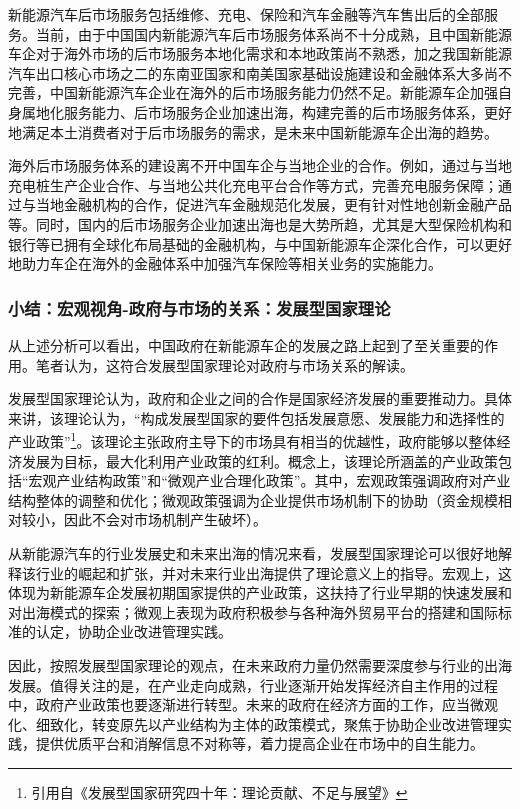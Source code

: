 \documentclass[a4paper, 10pt]{article}
\begin{document}
新能源汽车后市场服务包括维修、充电、保险和汽车金融等汽车售出后的全部服务。当前，由于中国国内新能源汽车后市场服务体系尚不十分成熟，且中国新能源车企对于海外市场的后市场服务本地化需求和本地政策尚不熟悉，加之我国新能源汽车出口核心市场之二的东南亚国家和南美国家基础设施建设和金融体系大多尚不完善，中国新能源汽车企业在海外的后市场服务能力仍然不足。新能源车企加强自身属地化服务能力、后市场服务企业加速出海，构建完善的后市场服务体系，更好地满足本土消费者对于后市场服务的需求，是未来中国新能源车企出海的趋势。

海外后市场服务体系的建设离不开中国车企与当地企业的合作。例如，通过与当地充电桩生产企业合作、与当地公共化充电平台合作等方式，完善充电服务保障；通过与当地金融机构的合作，促进汽车金融规范化发展，更有针对性地创新金融产品等。同时，国内的后市场服务企业加速出海也是大势所趋，尤其是大型保险机构和银行等已拥有全球化布局基础的金融机构，与中国新能源车企深化合作，可以更好地助力车企在海外的金融体系中加强汽车保险等相关业务的实施能力。

  \subsubsection{小结：宏观视角-政府与市场的关系：发展型国家理论}
  从上述分析可以看出，中国政府在新能源车企的发展之路上起到了至关重要的作用。笔者认为，这符合发展型国家理论对政府与市场关系的解读。

发展型国家理论认为，政府和企业之间的合作是国家经济发展的重要推动力。具体来讲，该理论认为，“构成发展型国家的要件包括发展意愿、发展能力和选择性的产业政策”\footnote{引用自《发展型国家研究四十年：理论贡献、不足与展望》}。该理论主张政府主导下的市场具有相当的优越性，政府能够以整体经济发展为目标，最大化利用产业政策的红利。概念上，该理论所涵盖的产业政策包括“宏观产业结构政策”和“微观产业合理化政策”。其中，宏观政策强调政府对产业结构整体的调整和优化；微观政策强调为企业提供市场机制下的协助（资金规模相对较小，因此不会对市场机制产生破坏）。

从新能源汽车的行业发展史和未来出海的情况来看，发展型国家理论可以很好地解释该行业的崛起和扩张，并对未来行业出海提供了理论意义上的指导。宏观上，这体现为新能源车企发展初期国家提供的产业政策，这扶持了行业早期的快速发展和对出海模式的探索；微观上表现为政府积极参与各种海外贸易平台的搭建和国际标准的认定，协助企业改进管理实践。

因此，按照发展型国家理论的观点，在未来政府力量仍然需要深度参与行业的出海发展。值得关注的是，在产业走向成熟，行业逐渐开始发挥经济自主作用的过程中，政府产业政策也要逐渐进行转型。未来的政府在经济方面的工作，应当微观化、细致化，转变原先以产业结构为主体的政策模式，聚焦于协助企业改进管理实践，提供优质平台和消解信息不对称等，着力提高企业在市场中的自生能力。
 
\end{document}
